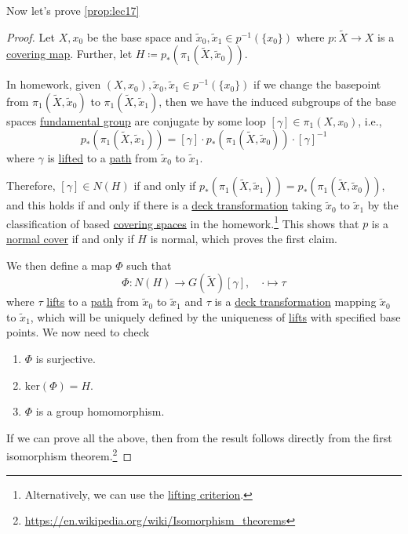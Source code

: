 Now let's prove \autoref{prop:lec17}
\begin{proof}
	Let \(X, x_0\) be the base space and \(\widetilde{x} _0, \widetilde{x} _1\in p^{-1} (\{x_0\})\) where \(p\colon \widetilde{X} \to X\) is a
	\hyperref[def:covering-map]{covering map}. Further, let \(H\coloneqq p_\ast(\pi _1(\widetilde{X} , \widetilde{x} _0))\).

	In homework, given \((X, x_0), \widetilde{x} _0, \widetilde{x} _1\in p^{-1} (\{x_0\})\) if we change the basepoint from \(\pi _1(\widetilde{X} , \widetilde{x} _0)\)
	to \(\pi _1(\widetilde{X} , \widetilde{x} _1)\), then we have the induced subgroups of the base spaces \hyperref[def:fundamental-group]{fundamental group}
	are conjugate by some loop \([\gamma ]\in \pi _1(X, x_0)\), i.e.,
	\[
		p_\ast (\pi _1(\widetilde{X} , \widetilde{x} _1)) = [\gamma ]\cdot p_\ast (\pi _1(\widetilde{X} , \widetilde{x} _0))\cdot [\gamma ]^{-1}
	\]
	where \(\gamma\) is \hyperref[prop:homotopy-lifting-property]{lifted} to a \hyperref[def:path]{path} from \(\widetilde{x} _0\) to \(\widetilde{x} _1\).

	\par Therefore, \([\gamma ]\in N(H)\) if and only if \(p_\ast(\pi _1(\widetilde{X} , \widetilde{x} _1)) = p_\ast(\pi _1(\widetilde{X} , \widetilde{x} _0))\),
	and this holds if and only if there is a \hyperref[def:deck-transformation]{deck transformation} taking \(\widetilde{x} _0\) to \(\widetilde{x} _1\)
	by the classification of based \hyperref[def:covering-space]{covering spaces} in the homework.\footnote{Alternatively, we can use the \hyperref[prop:lifting-criterion]{lifting criterion}.}
	This shows that \(p\) is a \hyperref[def:normal]{normal cover} if and only if \(H\) is normal, which proves the first claim.

	\par We then define a map \(\Phi \) such that
	\[
		\Phi \colon N(H)\to G(\widetilde{X} )[\gamma ],\quad \cdot \mapsto \tau
	\]
	where \(\tau \) \hyperref[prop:homotopy-lifting-property]{lifts} to a \hyperref[def:path]{path} from \(\widetilde{x} _0\) to \(\widetilde{x} _1\) and
	\(\tau \) is a \hyperref[def:deck-transformation]{deck transformation} mapping \(\widetilde{x} _0\) to \(\widetilde{x} _1\), which will be
	uniquely defined by the uniqueness of \hyperref[prop:homotopy-lifting-property]{lifts} with specified base points. We now need to check
	\begin{enumerate}
		\item \(\Phi \) is surjective.
		\item \(\mathrm{ker} (\Phi )= H\).
		\item \(\Phi \) is a group homomorphism.
	\end{enumerate}
	If we can prove all the above, then from the result follows directly from the first isomorphism theorem.\footnote{\url{https://en.wikipedia.org/wiki/Isomorphism_theorems}}


\end{proof}
